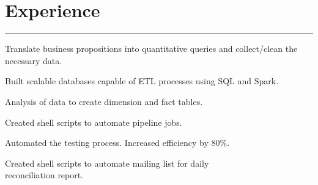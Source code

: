 \documentclass[]{puneet-resume}
\begin{document}
\begin{minipage}[t]{0.66\textwidth}
\section{Experience}
\noindent\rule{12.5cm}{0.4pt}
 
\noindent
\hspace{2.8em}%
\begin{minipage}{0.85\textwidth\vspace{0pt}}
\begin{tightemize}
	\item {}
	\begin{subtightemize}
		\item Translate business propositions into quantitative queries and collect/clean the necessary data.
		\item Built scalable databases capable of ETL processes using SQL and Spark.
		\item Analysis of data to create dimension and fact tables.
		\item Created shell scripts to automate pipeline jobs.
	\end{subtightemize}
	\item {}
	\begin{subtightemize}
		\item Automated the testing process. Increased efficiency by 80\%.
		\item Created shell scripts to automate mailing list for daily\\
		reconciliation report.
	\end{subtightemize}
\end{tightemize}
\end{minipage}
\sectionsep


\end{minipage}
\end{document}
